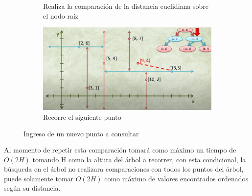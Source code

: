 \documentclass{article}
\begin{document}
\begin{figure}
\begin{subfigure}[b]{0.4\linewidth}
                 \caption{Realiza la comparación de la distancia euclidiana sobre el nodo raíz}
                 \label{fig:knn3}
             \end{subfigure}
             \hfill
             \begin{subfigure}[b]{0.4\linewidth}
                 \centering
                 \includegraphics[width=\textwidth]{img/knn4.PNG}
                 \caption{Recorre el siguiente punto}
                 \label{fig:knn4}
             \end{subfigure}
                \caption{Ingreso de un nuevo punto a consultar}
                \label{fig:knn_1_parte}
            \end{figure}
            
            Al momento de repetir esta comparación tomará como máximo un tiempo de $O(2H)$ tomando H como la altura del árbol a recorrer, con esta condicional, la búsqueda en el árbol no realizara comparaciones con todos los puntos del árbol, puede solamente tomar $O(2H)$ como máximo de valores encontrados ordenados según su distancia.
            
\end{document}
